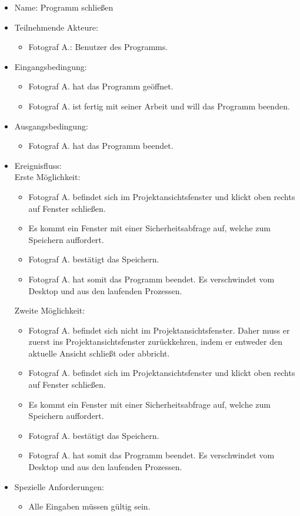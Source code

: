 	\begin{itemize}
		\item Name: Programm schließen
		\item Teilnehmende Akteure:
		\begin{itemize}
			\item	Fotograf A.: Benutzer des Programms.
		\end{itemize}
		\item Eingangsbedingung:
		\begin{itemize}
			\item Fotograf A. hat das Programm geöffnet.
			\item Fotograf A. ist fertig mit seiner Arbeit und will das Programm beenden.						
		\end{itemize}
		\item Ausgangsbedingung:
		\begin{itemize}
			\item	Fotograf A. hat das Programm beendet.		
		\end{itemize}
		\item Ereignisfluss:\\Erste Möglichkeit:	
		\begin{itemize}
			\item Fotograf A. befindet sich im Projektansichtsfenster und klickt oben rechts auf Fenster schließen.
			\item Es kommt ein Fenster mit einer Sicherheitsabfrage auf, welche zum Speichern auffordert.
			\item Fotograf A. bestätigt das Speichern.
			\item Fotograf A. hat somit das Programm beendet. Es verschwindet vom Desktop und aus den laufenden Prozessen.
		\end{itemize}
		Zweite Möglichkeit:
		\begin{itemize}
			\item Fotograf A. befindet sich nicht im Projektansichtsfenster. Daher muss er zuerst ins Projektansichtsfenster zurückkehren, indem er entweder den aktuelle Ansicht schließt oder abbricht.
			\item Fotograf A. befindet sich im Projektansichtsfenster und klickt oben rechts auf Fenster schließen.
			\item Es kommt ein Fenster mit einer Sicherheitsabfrage auf, welche zum Speichern auffordert.
			\item Fotograf A. bestätigt das Speichern.
			\item Fotograf A. hat somit das Programm beendet. Es verschwindet vom Desktop und aus den laufenden Prozessen.
		\end{itemize}	
		\item Spezielle Anforderungen:
		\begin{itemize}
			\item	Alle Eingaben müssen gültig sein.		
		\end{itemize}
	\end{itemize}
	
